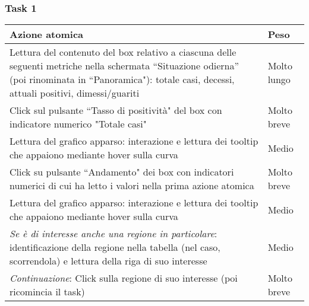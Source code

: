 \subsubsection{Task 1}
\label{sss:iaa-task-1}
{
\renewcommand{\arraystretch}{2}
\begin{longtable}[h]{| p{14cm} | p{2.5cm} |}
    \hline
    \textbf{Azione atomica} & \textbf{Peso} \\
    \hline
    \endhead
    Lettura del contenuto del box relativo a ciascuna delle seguenti metriche nella schermata ``Situazione odierna'' (poi rinominata in ``Panoramica"): totale casi, decessi, attuali positivi, dimessi/guariti & Molto lungo \\
    \hline
    Click sul pulsante ``Tasso di positività" del box con indicatore numerico "Totale casi" & Molto breve \\
    \hline
    Lettura del grafico apparso: interazione e lettura dei tooltip che appaiono mediante hover sulla curva & Medio \\
    \hline
    Click su pulsante ``Andamento" dei box con indicatori numerici di cui ha letto i valori nella prima azione atomica & Molto breve \\
    \hline
    Lettura del grafico apparso: interazione e lettura dei tooltip che appaiono mediante hover sulla curva & Medio \\
    \hline
    \textit{Se è di interesse anche una regione in particolare}: identificazione della regione nella tabella (nel caso, scorrendola) e lettura della riga di suo interesse & Medio \\
    \hline
    \textit{Continuazione}: Click sulla regione di suo interesse (poi ricomincia il task) & Molto breve \\
    \hline
\end{longtable}
}